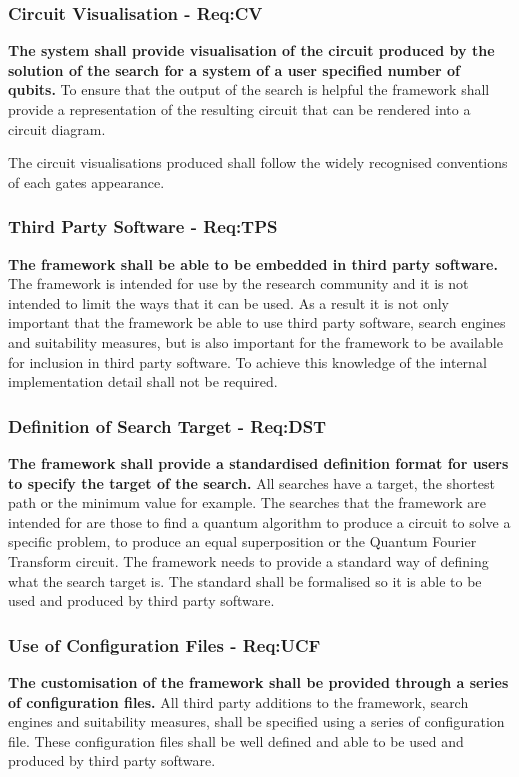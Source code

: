 \subsubsection{Circuit Visualisation  - Req:CV}
\label{sec:reqcv}
\textbf{The system shall provide visualisation of the circuit produced by the solution of the search for a system of a user specified number of qubits.}
To ensure that the output of the search is helpful the framework shall provide a representation of the resulting circuit that can be rendered into a circuit diagram.

The circuit visualisations produced shall follow the widely recognised conventions of each gates appearance.

\subsubsection{Third Party Software - Req:TPS}
\label{sec:reqtps}
\textbf{The framework shall be able to be embedded in third party software.}
The framework is intended for use by the research community and it is not intended to limit the ways that it can be used.
As a result it is not only important that the framework be able to use third party software, search engines and suitability measures, but is also important for the framework to be available for inclusion in third party software.
To achieve this knowledge of the internal implementation detail shall not be required.

\subsubsection{Definition of Search Target - Req:DST}
\label{sec:reqdst}
\textbf{The framework shall provide a standardised definition format for users to specify the target of the search.}
All searches have a target, the shortest path or the minimum value for example.
The searches that the framework are intended for are those to find a quantum algorithm to produce a circuit to solve a specific problem, to produce an equal superposition or the Quantum Fourier Transform circuit.
The framework needs to provide a standard way of defining what the search target is.
The standard shall be formalised so it is able to be used and produced by third party software.

\subsubsection{Use of Configuration Files - Req:UCF}
\label{sec:requcf}
\textbf{The customisation of the framework shall be provided through a series of configuration files.}
All third party additions to the framework, search engines and suitability measures, shall be specified using a series of configuration file.
These configuration files shall be well defined and able to be used and produced by third party software.

